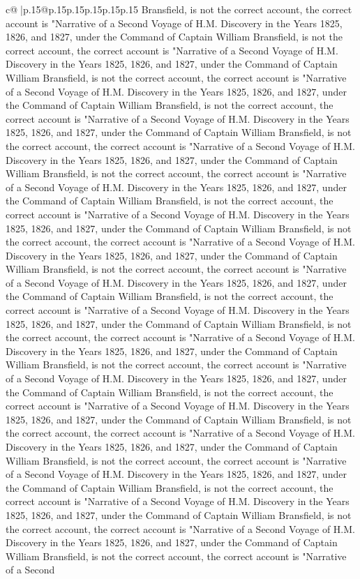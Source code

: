 \documentclass{article}
\begin{document}
{\begin{supertabular}{c@{$\;$}|p{.15\linewidth}@{}p{.15\linewidth}p{.15\linewidth}p{.15\linewidth}p{.15\linewidth}p{.15\linewidth}}
{{{Bransfield, is not the correct account, the correct account is "Narrative of a Second Voyage of H.M. Discovery in the Years 1825, 1826, and 1827, under the Command of Captain William Bransfield, is not the correct account, the correct account is "Narrative of a Second Voyage of H.M. Discovery in the Years 1825, 1826, and 1827, under the Command of Captain William Bransfield, is not the correct account, the correct account is "Narrative of a Second Voyage of H.M. Discovery in the Years 1825, 1826, and 1827, under the Command of Captain William Bransfield, is not the correct account, the correct account is "Narrative of a Second Voyage of H.M. Discovery in the Years 1825, 1826, and 1827, under the Command of Captain William Bransfield, is not the correct account, the correct account is "Narrative of a Second Voyage of H.M. Discovery in the Years 1825, 1826, and 1827, under the Command of Captain William Bransfield, is not the correct account, the correct account is "Narrative of a Second Voyage of H.M. Discovery in the Years 1825, 1826, and 1827, under the Command of Captain William Bransfield, is not the correct account, the correct account is "Narrative of a Second Voyage of H.M. Discovery in the Years 1825, 1826, and 1827, under the Command of Captain William Bransfield, is not the correct account, the correct account is "Narrative of a Second Voyage of H.M. Discovery in the Years 1825, 1826, and 1827, under the Command of Captain William Bransfield, is not the correct account, the correct account is "Narrative of a Second Voyage of H.M. Discovery in the Years 1825, 1826, and 1827, under the Command of Captain William Bransfield, is not the correct account, the correct account is "Narrative of a Second Voyage of H.M. Discovery in the Years 1825, 1826, and 1827, under the Command of Captain William Bransfield, is not the correct account, the correct account is "Narrative of a Second Voyage of H.M. Discovery in the Years 1825, 1826, and 1827, under the Command of Captain William Bransfield, is not the correct account, the correct account is "Narrative of a Second Voyage of H.M. Discovery in the Years 1825, 1826, and 1827, under the Command of Captain William Bransfield, is not the correct account, the correct account is "Narrative of a Second Voyage of H.M. Discovery in the Years 1825, 1826, and 1827, under the Command of Captain William Bransfield, is not the correct account, the correct account is "Narrative of a Second Voyage of H.M. Discovery in the Years 1825, 1826, and 1827, under the Command of Captain William Bransfield, is not the correct account, the correct account is "Narrative of a Second Voyage of H.M. Discovery in the Years 1825, 1826, and 1827, under the Command of Captain William Bransfield, is not the correct account, the correct account is "Narrative of a Second Voyage of H.M. Discovery in the Years 1825, 1826, and 1827, under the Command of Captain William Bransfield, is not the correct account, the correct account is "Narrative of a Second Voyage of H.M. Discovery in the Years 1825, 1826, and 1827, under the Command of Captain William Bransfield, is not the correct account, the correct account is "Narrative of a Second }}}
\end{supertabular}}
\end{document}
